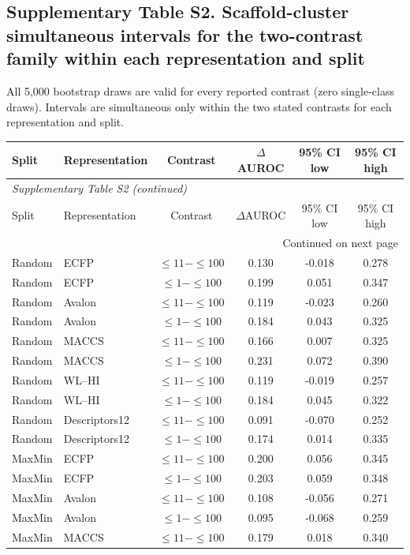 \subsection*{Supplementary Table S2. Scaffold-cluster simultaneous intervals for the two-contrast family within each representation and split}
All 5,000 bootstrap draws are valid for every reported contrast (zero single-class draws). Intervals are simultaneous only within the two stated contrasts for each representation and split.
\begin{longtable}{llcccc}

\toprule Split & Representation & Contrast & $\Delta$AUROC & 95\% CI low & 95\% CI high \\ \midrule\endfirsthead
\multicolumn{6}{l}{\textit{Supplementary Table S2 (continued)}} \\
\toprule Split & Representation & Contrast & $\Delta$AUROC & 95\% CI low & 95\% CI high \\ \midrule\endhead
\midrule\multicolumn{6}{r}{Continued on next page}\\\endfoot
\bottomrule\endlastfoot
Random & ECFP & $\leq11-\leq100$ & 0.130 & -0.018 & 0.278 \\
Random & ECFP & $\leq1-\leq100$ & 0.199 & 0.051 & 0.347 \\
Random & Avalon & $\leq11-\leq100$ & 0.119 & -0.023 & 0.260 \\
Random & Avalon & $\leq1-\leq100$ & 0.184 & 0.043 & 0.325 \\
Random & MACCS & $\leq11-\leq100$ & 0.166 & 0.007 & 0.325 \\
Random & MACCS & $\leq1-\leq100$ & 0.231 & 0.072 & 0.390 \\
Random & WL--HI & $\leq11-\leq100$ & 0.119 & -0.019 & 0.257 \\
Random & WL--HI & $\leq1-\leq100$ & 0.184 & 0.045 & 0.322 \\
Random & Descriptors12 & $\leq11-\leq100$ & 0.091 & -0.070 & 0.252 \\
Random & Descriptors12 & $\leq1-\leq100$ & 0.174 & 0.014 & 0.335 \\
\addlinespace
MaxMin & ECFP & $\leq11-\leq100$ & 0.200 & 0.056 & 0.345 \\
MaxMin & ECFP & $\leq1-\leq100$ & 0.203 & 0.059 & 0.348 \\
MaxMin & Avalon & $\leq11-\leq100$ & 0.108 & -0.056 & 0.271 \\
MaxMin & Avalon & $\leq1-\leq100$ & 0.095 & -0.068 & 0.259 \\
MaxMin & MACCS & $\leq11-\leq100$ & 0.179 & 0.018 & 0.340 \\

\end{longtable}
